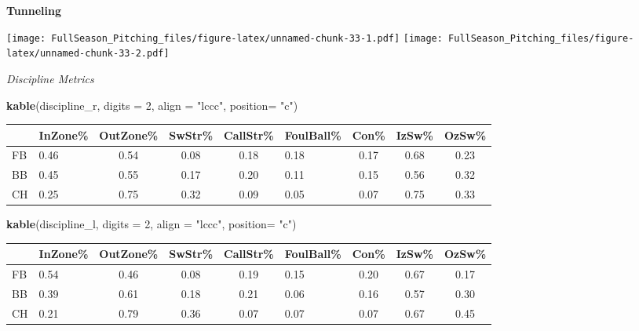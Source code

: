 \documentclass[]{article}
\newenvironment{Shaded}{\begin{snugshade}}{\end{snugshade}}
\newcommand{\KeywordTok}[1]{\textcolor[rgb]{0.13,0.29,0.53}{\textbf{#1}}}
\newcommand{\DataTypeTok}[1]{\textcolor[rgb]{0.13,0.29,0.53}{#1}}
\newcommand{\DecValTok}[1]{\textcolor[rgb]{0.00,0.00,0.81}{#1}}
\newcommand{\StringTok}[1]{\textcolor[rgb]{0.31,0.60,0.02}{#1}}
\newcommand{\NormalTok}[1]{#1}
\begin{document}
\textbf{Tunneling}

\texttt{[image: FullSeason\_Pitching\_files/figure-latex/unnamed-chunk-33-1.pdf]}
\texttt{[image: FullSeason\_Pitching\_files/figure-latex/unnamed-chunk-33-2.pdf]}

\emph{Discipline Metrics}

\begin{Shaded}
\begin{Highlighting}[]
\KeywordTok{kable}\NormalTok{(discipline_r, }\DataTypeTok{digits =} \DecValTok{2}\NormalTok{, }\DataTypeTok{align =} \StringTok{"lccc"}\NormalTok{, }\DataTypeTok{position=} \StringTok{"c"}\NormalTok{)}
\end{Highlighting}
\end{Shaded}

\begin{longtable}[]{@{}llccclccc@{}}
\toprule
& InZone\% & OutZone\% & SwStr\% & CallStr\% & FoulBall\% & Con\% &
IzSw\% & OzSw\%\tabularnewline
\midrule
\endhead
FB & 0.46 & 0.54 & 0.08 & 0.18 & 0.18 & 0.17 & 0.68 &
0.23\tabularnewline
BB & 0.45 & 0.55 & 0.17 & 0.20 & 0.11 & 0.15 & 0.56 &
0.32\tabularnewline
CH & 0.25 & 0.75 & 0.32 & 0.09 & 0.05 & 0.07 & 0.75 &
0.33\tabularnewline
\bottomrule
\end{longtable}

\begin{Shaded}
\begin{Highlighting}[]
\KeywordTok{kable}\NormalTok{(discipline_l, }\DataTypeTok{digits =} \DecValTok{2}\NormalTok{, }\DataTypeTok{align =} \StringTok{"lccc"}\NormalTok{, }\DataTypeTok{position=} \StringTok{"c"}\NormalTok{)}
\end{Highlighting}
\end{Shaded}

\begin{longtable}[]{@{}llccclccc@{}}
\toprule
& InZone\% & OutZone\% & SwStr\% & CallStr\% & FoulBall\% & Con\% &
IzSw\% & OzSw\%\tabularnewline
\midrule
\endhead
FB & 0.54 & 0.46 & 0.08 & 0.19 & 0.15 & 0.20 & 0.67 &
0.17\tabularnewline
BB & 0.39 & 0.61 & 0.18 & 0.21 & 0.06 & 0.16 & 0.57 &
0.30\tabularnewline
CH & 0.21 & 0.79 & 0.36 & 0.07 & 0.07 & 0.07 & 0.67 &
0.45\tabularnewline
\bottomrule
\end{longtable}
\end{document}
